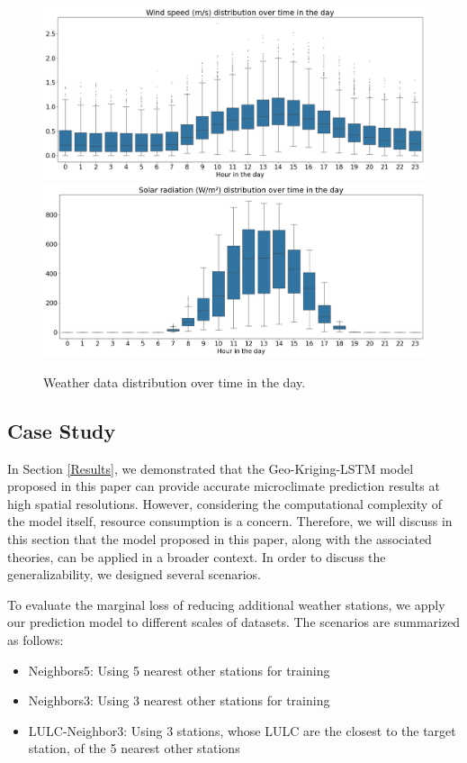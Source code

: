 \documentclass[a4paper,fleqn]{cas-sc}
\begin{document}
\begin{figure}[!h]
	\centering
	\includegraphics[scale=0.35]{figs/new_figs/wsboxplot.png}
	\includegraphics[scale=0.35]{figs/new_figs/srboxplot.png}
	\caption{Weather data distribution over time in the day.}
	\label{FIG:srbox}
\end{figure}
\fi

\iffalse 
\subsection{Case Study}

In Section \ref{Results}, we demonstrated that the Geo-Kriging-LSTM model proposed in this paper can provide accurate microclimate prediction results at high spatial resolutions. However, considering the computational complexity of the model itself, resource consumption is a concern. Therefore, we will discuss in this section that the model proposed in this paper, along with the associated theories, can be applied in a broader context. In order to discuss the generalizability, we designed several scenarios.

To evaluate the marginal loss of reducing additional weather stations, we apply our prediction model to different scales of datasets. The scenarios are summarized as follows:
\begin{itemize}
    \item Neighbors5: Using 5 nearest other stations for training
    \item Neighbors3: Using 3 nearest other stations for training
    \item LULC-Neighbor3: Using 3 stations, whose LULC are the closest to the target station, of the 5 nearest other stations
\end{itemize}
\end{document}
